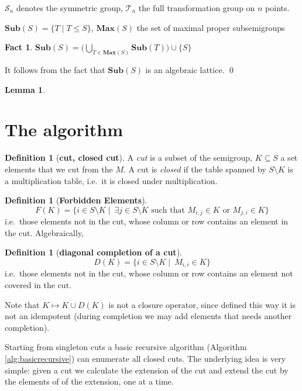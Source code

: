 \documentclass{amsart}
\newcommand{\cT}{{\mathcal T}}
\newcommand{\cS}{{\mathcal S}}
\newcommand{\Sub}{\mathbf{Sub}}
\newcommand{\Max}{\mathbf{Max}}
\theoremstyle{plain}
\newtheorem{lemma}[theorem]{Lemma}
\newtheorem{fact}[theorem]{Fact}
\theoremstyle{definition}
\newtheorem{definition}[theorem]{Definition}
\begin{document}
$\cS_n$ denotes the symmetric group, $\cT_n$ the full transformation group on $n$ points.

$\Sub(S)=\big\{T\mid T\leq S \big\}$, $\Max(S)$ the set of maximal proper subsemigroups

\begin{fact}
$\Sub(S)=\big( \bigcup_{T\in \Max(S)}\Sub(T)\big)\cup \{S\}$
\end{fact}
\proof
It follows from the fact that $\Sub(S)$ is an algebraic lattice.
\qed

\begin{lemma}

\end{lemma}

\section{The algorithm}
\begin{definition}[\textbf{cut, closed cut}]
A \emph{cut} is a subset of the semigroup, $K\subseteq S$ a set elements that we cut from the $M$.  A cut is \emph{closed} if the table spanned by $S\setminus K$ is a multiplication table, i.e.\ it is closed under multiplication.
\end{definition}

\begin{definition}[\textbf{Forbidden Elements}]
$$F(K)=\{i\in S\setminus K \mid\ \exists j\in S\setminus K \text{ such that } M_{i,j}\in K \text{ or } M_{j,i}\in K\} $$
\noindent i.e.\ those elements not in the cut, whose column or row contains an element in the cut.
Algebraically, 
\end{definition}



\begin{definition}[\textbf{diagonal completion of a cut}]
$$D(K)=\{i\in S\setminus K \mid\ M_{i,i}\in K \} $$
\noindent i.e.\ those elements not in the cut, whose column or row contains an element not covered in the cut.
\end{definition}


Note that $K\mapsto K\cup D(K)$ is not a closure operator, since defined this way it is not an idempotent (during completion we may add elements that needs another completion).

 Starting from singleton cuts a basic recursive algorithm (Algorithm \ref{alg:basicrecursive}) can enumerate all closed cuts. The underlying idea is very simple: given a cut we calculate the extension of the cut and extend the cut by the elements of of the extension, one at a time. 
\end{document}
